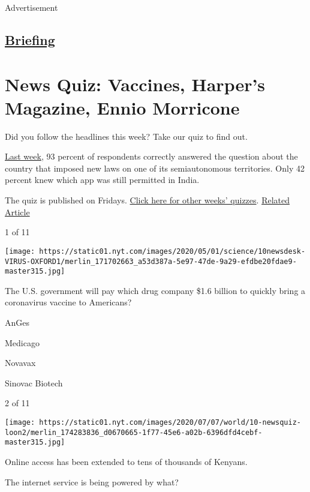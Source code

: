 Advertisement

\hypertarget{-briefing-}{%
\subsection{\texorpdfstring{
\href{/interactive/2018/briefing/global-morning-briefing-newsletter-signup.html}{Briefing}
}{ Briefing }}\label{-briefing-}}

\hypertarget{news-quiz-vaccines-harpers-magazine-ennio-morricone}{%
\section{News Quiz: Vaccines, Harper's Magazine, Ennio
Morricone}\label{news-quiz-vaccines-harpers-magazine-ennio-morricone}}

Did you follow the headlines this week? Take our quiz to find out.

\href{https://www.nytimes.com/interactive/2020/07/03/briefing/russia-carl-reiner-supreme-court-news-quiz.html}{Last
week}, 93 percent of respondents correctly answered the question about
the country that imposed new laws on one of its semiautonomous
territories. Only 42 percent knew which app was still permitted in
India.

The quiz is published on Fridays.
\href{https://www.nytimes.com/spotlight/news-quiz}{Click here for other
weeks' quizzes}.
\href{https://www.nytimes.com/interactive/2020/07/03/briefing/russia-carl-reiner-supreme-court-news-quiz.html}{Related
Article}

1 of 11

\texttt{[image: https://static01.nyt.com/images/2020/05/01/science/10newsdesk-VIRUS-OXFORD1/merlin\_171702663\_a53d387a-5e97-47de-9a29-efdbe20fdae9-master315.jpg]}

The U.S. government will pay which drug company \$1.6 billion to quickly
bring a coronavirus vaccine to Americans?

AnGes

Medicago

Novavax

Sinovac Biotech

2 of 11

\texttt{[image: https://static01.nyt.com/images/2020/07/07/world/10-newsquiz-loon2/merlin\_174283836\_d0670665-1f77-45e6-a02b-6396dfd4cebf-master315.jpg]}

Online access has been extended to tens of thousands of Kenyans.

The internet service is being powered by what?

